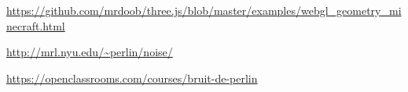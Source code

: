 \vspace{0.5cm}
\url{https://github.com/mrdoob/three.js/blob/master/examples/webgl_geometry_minecraft.html}

\vspace{0.5cm}
\url{http://mrl.nyu.edu/~perlin/noise/}

\vspace{0.5cm}
\url{https://openclassrooms.com/courses/bruit-de-perlin}